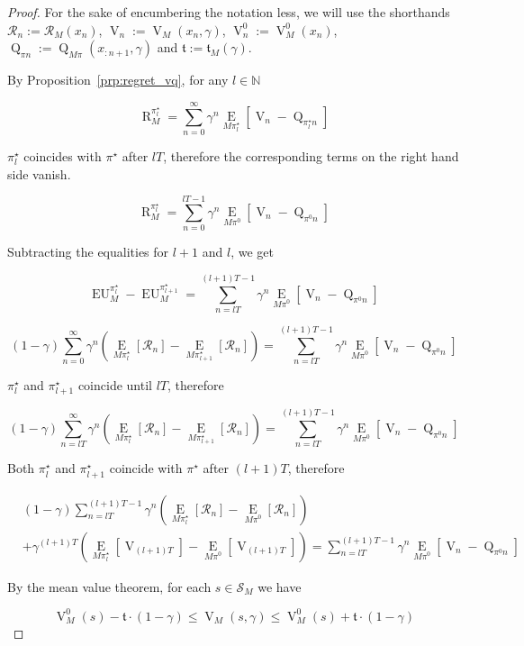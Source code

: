 \documentclass[anon,12pt]{colt2018} %
\newcommand{\Comment}[1]{}
\newcommand{\AP}[1]{\left(#1\right)}
\newcommand{\AB}[1]{\left[#1\right]}
\newcommand{\Ea}[2]{\underset{#1}{\operatorname{E}}\AB{#2}}
\newcommand{\Nats}{\mathbb{N}}
\newcommand{\A}{\mathcal{A}}
\newcommand{\St}{\mathcal{S}}
\newcommand{\R}{\mathcal{R}}
\newcommand{\V}{\operatorname{V}}
\newcommand{\Q}{\operatorname{Q}}
\newcommand{\EU}{\operatorname{EU}}
\newcommand{\Rg}{\operatorname{R}}
\newcommand{\Tn}{\mathfrak{t}}
\begin{document}
\begin{proof}

For the sake of encumbering the notation less, we will use the shorthands $\R_n:=\R_M\AP{x_n}$, $\V_n:=\V_M\AP{x_n,\gamma}$, $\V^0_n:=\V^0_M\AP{x_n}$, $\Q_{\pi n}:=\Q_{M\pi}\AP{x_{:n+1},\gamma}$ and $\Tn:=\Tn_M(\gamma)$.

By Proposition~\ref{prp:regret_vq}, for any $l \in \Nats$

$$\Rg_M^{\pi_l^\star} = \sum_{n=0}^\infty{\gamma^n \Ea{M\pi_l^\star}{\V_n-\Q_{\pi^\star_l n}}}$$

$\pi^\star_l$ coincides with $\pi^\star$ after $lT$, therefore the corresponding terms on the right hand side vanish.

$$\Rg_M^{\pi_l^\star} = \sum_{n=0}^{lT-1}{\gamma^n \Ea{M\pi^0}{\V_n-\Q_{\pi^0 n}}}$$

Subtracting the equalities for $l+1$ and $l$, we get

$$\EU_M^{\pi_{l}^\star} - \EU_M^{\pi_{l+1}^\star} = \sum_{n=lT}^{(l+1)T-1}{\gamma^n \Ea{M\pi^0}{\V_n-\Q_{\pi^0n}}}$$

$$(1-\gamma)\sum_{n=0}^\infty {\gamma^n\AP{\Ea{M\pi^\star_l}{\R_n}-\Ea{M\pi^\star_{l+1}}{\R_n}}} = \sum_{n=lT}^{(l+1)T-1}{\gamma^n \Ea{M\pi^0}{\V_n-\Q_{\pi^0n}}}$$

$\pi^\star_l$ and $\pi^\star_{l+1}$ coincide until $lT$, therefore

$$(1-\gamma)\sum_{n=lT}^\infty {\gamma^n\AP{\Ea{M\pi^\star_l}{\R_n}-\Ea{M\pi^\star_{l+1}}{\R_n}}} = \sum_{n=lT}^{(l+1)T-1}{\gamma^n \Ea{M\pi^0}{\V_n-\Q_{\pi^0n}}}$$

\Comment{Denote $\rho^*_l:=\mu\bowtie\pi^*_l$, $\rho^0:=\mu\bowtie\pi^0$. We also use the shorthand notations $r_n:=r\AP{x_{:n}}$, $\V_n(\gamma):=\V\AP{x_{:n},\gamma}$, $\Q_n(\gamma):=\Q\AP{x_{:n},x_n^\A,\gamma}$.} Both $\pi^\star_l$ and $\pi^\star_{l+1}$ coincide with $\pi^\star$ after $(l+1)T$, therefore

\begin{align*}
&(1-\gamma)\sum_{n=lT}^{(l+1)T-1} {\gamma^n\AP{\Ea{M\pi^\star_l}{\R_n}-\Ea{M\pi^0}{\R_n}}}\\ 
&+ \gamma^{(l+1)T}\AP{\Ea{M\pi^\star_l}{\V_{(l+1)T}}-\Ea{M\pi^0}{\V_{(l+1)T}}} = \sum_{n=lT}^{(l+1)T-1}{\gamma^n \Ea{M\pi^0}{\V_n-\Q_{\pi^0n}}}
\end{align*}

By the mean value theorem, for each $s\in\St_M$ we have

$$\V_M^0(s) - \Tn \cdot (1-\gamma) \leq \V_M(s,\gamma) \leq \V_M^0(s) + \Tn \cdot (1-\gamma)$$


\end{proof}
\end{document}
